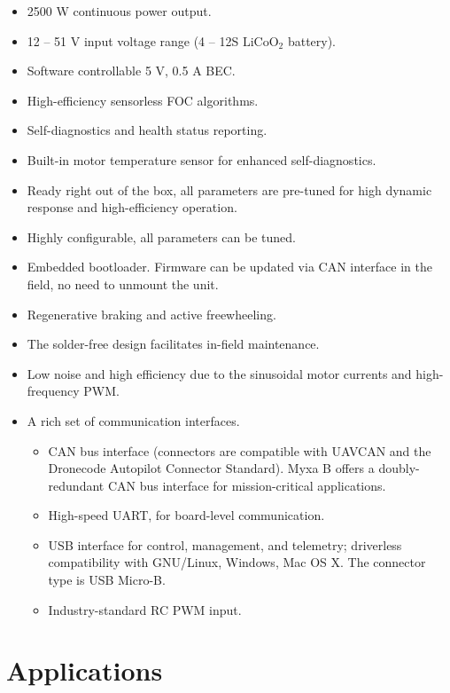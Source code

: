 \documentclass{../document_templates/documentation_template_latex/zubaxdoc}
\begin{document}
\begin{titlepage}
\begin{itemize}
    \item 2500 W continuous power output.
    \item 12 -- 51 V input voltage range (4 -- 12S $\text{LiCoO}_\text{2}$ battery).
    \item Software controllable 5 V, 0.5 A BEC.
    \item High-efficiency sensorless FOC algorithms.
    \item Self-diagnostics and health status reporting.
    \item Built-in motor temperature sensor for enhanced self-diagnostics.
    \item Ready right out of the box, all parameters are pre-tuned for high dynamic response and high-efficiency operation.
    \item Highly configurable, all parameters can be tuned.
    \item Embedded bootloader. Firmware can be updated via CAN interface in the field, no need to unmount the unit.
    \item Regenerative braking and active freewheeling.
    \item The solder-free design facilitates in-field maintenance.
    \item Low noise and high efficiency due to the sinusoidal \mbox{motor} currents and high-frequency PWM.
    \item A rich set of communication interfaces.
     \begin{itemize}
        \item CAN bus interface (connectors are compatible with UAVCAN and the Dronecode Autopilot Connector Standard).
         Myxa B offers a doubly-redundant CAN bus interface for mission-critical applications.
        \item High-speed UART, for board-level communication.
        \item USB interface for control, management, and telemetry; driverless compatibility with GNU/Linux, Windows,
        Mac OS X. The connector type is USB Micro-B.
        \item Industry-standard RC PWM input.
    \end{itemize}
\end{itemize}

\section*{Applications}


\end{titlepage}
\end{document}
